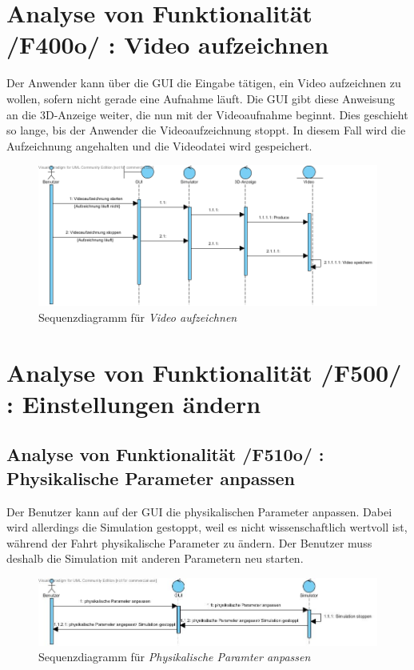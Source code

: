 \section{Analyse von Funktionalität /F400o/ :  Video aufzeichnen}
Der Anwender kann über die GUI die Eingabe tätigen, ein Video aufzeichnen zu wollen, sofern nicht gerade eine Aufnahme läuft. Die GUI gibt diese Anweisung an die 3D-Anzeige weiter, die nun mit der
Videoaufnahme beginnt. Dies geschieht so lange, bis der Anwender die Videoaufzeichnung stoppt. In diesem Fall wird die Aufzeichnung angehalten und die Videodatei wird gespeichert.


\begin{figure}
\includegraphics[width=\linewidth]{bilder/Video_aufzeichnen}
\caption{Sequenzdiagramm für \textit{Video aufzeichnen}}
\end{figure}

\section{Analyse von Funktionalität /F500/ :  Einstellungen ändern}
\subsection{Analyse von Funktionalität /F510o/ :  Physikalische Parameter anpassen}
Der Benutzer kann auf der GUI die physikalischen Parameter anpassen. Dabei wird allerdings die Simulation gestoppt, weil es nicht wissenschaftlich wertvoll ist, während der Fahrt physikalische Parameter zu ändern. Der Benutzer muss deshalb die Simulation mit anderen Parametern neu starten.

\begin{figure}
\includegraphics[width=\linewidth]{bilder/Physikalische_Parameter_anpassen.jpg}
\caption{Sequenzdiagramm für \textit{Physikalische Paramter anpassen}}
\end{figure}

